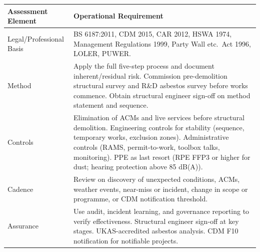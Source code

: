 \begin{table}[H]
\centering
\begin{tabularx}{\textwidth}{>{\raggedright\arraybackslash}p{3.2cm}X}
\toprule
\textbf{Assessment Element} & \textbf{Operational Requirement} \\
\midrule
Legal/Professional Basis & BS 6187:2011, CDM 2015, CAR 2012, HSWA 1974, Management Regulations 1999, Party Wall etc.\ Act 1996, LOLER, PUWER. \\
Method & Apply the full five-step process and document inherent/residual risk. Commission pre-demolition structural survey and R\&D asbestos survey before works commence. Obtain structural engineer sign-off on method statement and sequence. \\
Controls & Elimination of ACMs and live services before structural demolition. Engineering controls for stability (sequence, temporary works, exclusion zones). Administrative controls (RAMS, permit-to-work, toolbox talks, monitoring). PPE as last resort (RPE FFP3 or higher for dust; hearing protection above 85 dB(A)). \\
Cadence & Review on discovery of unexpected conditions, ACMs, weather events, near-miss or incident, change in scope or programme, or CDM notification threshold. \\
Assurance & Use audit, incident learning, and governance reporting to verify effectiveness. Structural engineer sign-off at key stages. UKAS-accredited asbestos analysis. CDM F10 notification for notifiable projects. \\
\bottomrule
\end{tabularx}
\end{table}

